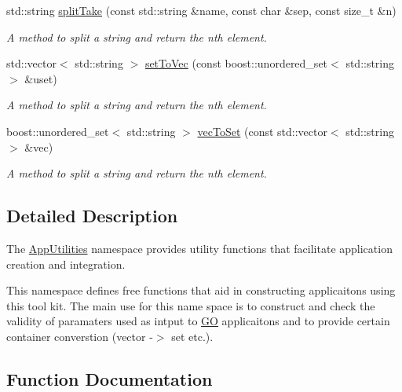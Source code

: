 \begin{DoxyCompactItemize}
std\+::string \hyperlink{namespaceAppUtilities_a2abdcb1877526f1093efe85c4f751aa9}{split\+Take} (const std\+::string \&name, const char \&sep, const size\+\_\+t \&n)
\begin{DoxyCompactList}\small\item\em A method to split a string and return the nth element. \end{DoxyCompactList}\item 
std\+::vector$<$ std\+::string $>$ \hyperlink{namespaceAppUtilities_a3ea1b7b49b7925da941433b1f604b95a}{set\+To\+Vec} (const boost\+::unordered\+\_\+set$<$ std\+::string $>$ \&uset)
\begin{DoxyCompactList}\small\item\em A method to split a string and return the nth element. \end{DoxyCompactList}\item 
boost\+::unordered\+\_\+set$<$ std\+::string $>$ \hyperlink{namespaceAppUtilities_a80196823944aee9964b4803f902e4805}{vec\+To\+Set} (const std\+::vector$<$ std\+::string $>$ \&vec)
\begin{DoxyCompactList}\small\item\em A method to split a string and return the nth element. \end{DoxyCompactList}\end{DoxyCompactItemize}


\subsection{Detailed Description}
The \hyperlink{namespaceAppUtilities}{App\+Utilities} namespace provides utility functions that facilitate application creation and integration. 

This namespace defines free functions that aid in constructing applicaitons using this tool kit. The main use for this name space is to construct and check the validity of paramaters used as intput to \hyperlink{namespaceGO}{GO} applicaitons and to provide certain container converstion (vector -\/$>$ set etc.). 

\subsection{Function Documentation}
